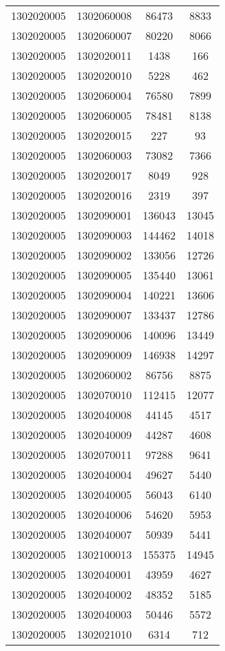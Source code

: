 \begin{longtable}[h]{llcc}
		1302020005 & 1302060008 & 86473 & 8833\\
		1302020005 & 1302060007 & 80220 & 8066\\
		1302020005 & 1302020011 & 1438 & 166\\
		1302020005 & 1302020010 & 5228 & 462\\
		1302020005 & 1302060004 & 76580 & 7899\\
		1302020005 & 1302060005 & 78481 & 8138\\
		1302020005 & 1302020015 & 227 & 93\\
		1302020005 & 1302060003 & 73082 & 7366\\
		1302020005 & 1302020017 & 8049 & 928\\
		1302020005 & 1302020016 & 2319 & 397\\
		1302020005 & 1302090001 & 136043 & 13045\\
		1302020005 & 1302090003 & 144462 & 14018\\
		1302020005 & 1302090002 & 133056 & 12726\\
		1302020005 & 1302090005 & 135440 & 13061\\
		1302020005 & 1302090004 & 140221 & 13606\\
		1302020005 & 1302090007 & 133437 & 12786\\
		1302020005 & 1302090006 & 140096 & 13449\\
		1302020005 & 1302090009 & 146938 & 14297\\
		1302020005 & 1302060002 & 86756 & 8875\\
		1302020005 & 1302070010 & 112415 & 12077\\
		1302020005 & 1302040008 & 44145 & 4517\\
		1302020005 & 1302040009 & 44287 & 4608\\
		1302020005 & 1302070011 & 97288 & 9641\\
		1302020005 & 1302040004 & 49627 & 5440\\
		1302020005 & 1302040005 & 56043 & 6140\\
		1302020005 & 1302040006 & 54620 & 5953\\
		1302020005 & 1302040007 & 50939 & 5441\\
		1302020005 & 1302100013 & 155375 & 14945\\
		1302020005 & 1302040001 & 43959 & 4627\\
		1302020005 & 1302040002 & 48352 & 5185\\
		1302020005 & 1302040003 & 50446 & 5572\\
		1302020005 & 1302021010 & 6314 & 712\\

\end{longtable}
